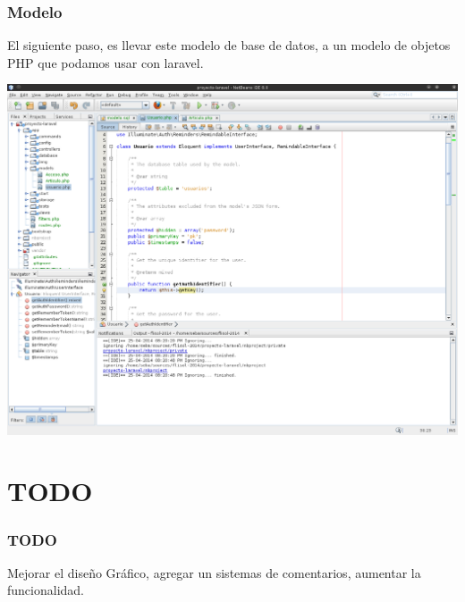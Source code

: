 \documentclass[12pt]{beamer}
\begin{document}
\begin{frame}
 \frametitle{Modelo}
 El siguiente paso, es llevar este modelo de base de datos, a un modelo de objetos PHP que podamos usar con laravel.
 \begin{center}
    \includegraphics[scale=0.3]{img/modelo_poo.png}
 \end{center}
\end{frame}


\section{TODO}

\begin{frame}
 \frametitle{TODO}
 Mejorar el diseño Gráfico, agregar un sistemas de comentarios, aumentar la funcionalidad.
\end{frame}


\end{document}
